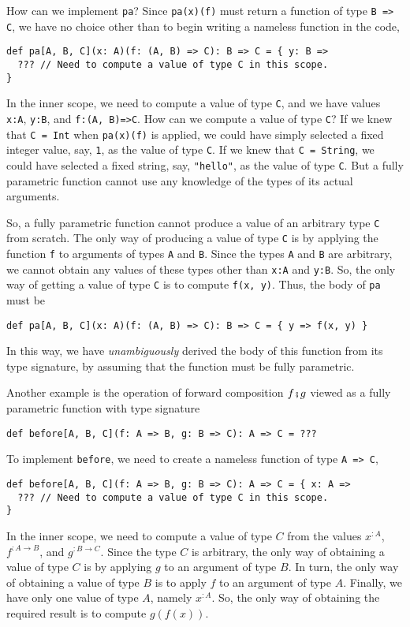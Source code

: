 How can we implement \lstinline!pa!? Since \lstinline!pa(x)(f)!
must return a function of type \lstinline!B => C!, we have no choice
other than to begin writing a nameless function in the code,
\begin{lstlisting}
def pa[A, B, C](x: A)(f: (A, B) => C): B => C = { y: B =>
  ??? // Need to compute a value of type C in this scope.
}
\end{lstlisting}
In the inner scope, we need to compute a value of type \lstinline!C!,
and we have values \lstinline!x:A!, \lstinline!y:B!, and \lstinline!f:(A, B)=>C!.
How can we compute a value of type \lstinline!C!? If we knew that
\lstinline!C = Int! when \lstinline!pa(x)(f)! is applied, we could
have simply selected a fixed integer value, say, \lstinline!1!, as
the value of type \lstinline!C!. If we knew that \lstinline!C = String!,
we could have selected a fixed string, say, \lstinline!"hello"!,
as the value of type \lstinline!C!. But a fully parametric function
cannot use any knowledge of the types of its actual arguments.

So, a fully parametric function cannot produce a value of an arbitrary
type \lstinline!C! from scratch. The only way of producing a value
of type \lstinline!C! is by applying the function \lstinline!f!
to arguments of types \lstinline!A! and \lstinline!B!. Since the
types \lstinline!A! and \lstinline!B! are arbitrary, we cannot obtain
any values of these types other than \lstinline!x:A! and \lstinline!y:B!.
So, the only way of getting a value of type \lstinline!C! is to compute
\lstinline!f(x, y)!. Thus, the body of \lstinline!pa! must be
\begin{lstlisting}
def pa[A, B, C](x: A)(f: (A, B) => C): B => C = { y => f(x, y) }
\end{lstlisting}
In this way, we have \emph{unambiguously} derived the body of this
function from its type signature, by assuming that the function must
be fully parametric.

Another example is the operation of forward composition $f\bef g$
viewed as a fully parametric function with type signature
\begin{lstlisting}
def before[A, B, C](f: A => B, g: B => C): A => C = ???
\end{lstlisting}
To implement \lstinline!before!, we need to create a nameless function
of type \lstinline!A => C!,
\begin{lstlisting}
def before[A, B, C](f: A => B, g: B => C): A => C = { x: A =>
  ??? // Need to compute a value of type C in this scope.
}
\end{lstlisting}
In the inner scope, we need to compute a value of type $C$ from the
values $x^{:A}$, $f^{:A\rightarrow B}$, and $g^{:B\rightarrow C}$.
Since the type $C$ is arbitrary, the only way of obtaining a value
of type $C$ is by applying $g$ to an argument of type $B$. In turn,
the only way of obtaining a value of type $B$ is to apply $f$ to
an argument of type $A$. Finally, we have only one value of type
$A$, namely $x^{:A}$. So, the only way of obtaining the required
result is to compute $g(f(x))$.

